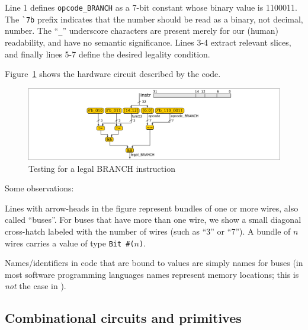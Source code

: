 Line 1 defines \verb|opcode_BRANCH| as a 7-bit constant whose binary
value is 1100011.  The \verb|`7b| prefix indicates that the number
should be read as a binary, not decimal, number.  The ``\verb|_|''
underscore characters are present merely for our (human) readability,
and have no semantic significance.  Lines 3-4 extract relevant slices,
and finally lines 5-7 define the desired legality condition.

Figure~\ref{Fig_Combo_Is_Legal_BRANCH} shows the hardware circuit described by the code.
\begin{figure}[htbp]
  \centerline{\includegraphics[width=6in,angle=0]{Figures/Fig_Combo_Is_Legal_BRANCH}}
  \caption{\label{Fig_Combo_Is_Legal_BRANCH}Testing for a legal BRANCH instruction}
\end{figure}
Some observations:
\begin{tightlist}

 \item Lines with arrow-heads in the figure represent bundles of one
   or more wires, also called ``buses''.  For buses that have more
   than one wire, we show a small diagonal cross-hatch labeled with
   the number of wires (such as ``3'' or ``7'').  A bundle of $n$
   wires carries a value of type {\tt Bit~\#($n$)}.

 \item Names/identifiers in {\BSV} code that are bound to values are
   simply names for buses (in most software programming languages
   names represent memory locations; this is \emph{not} the case in
   {\BSV}).

\end{tightlist}


\subsection{Combinational circuits and primitives}



